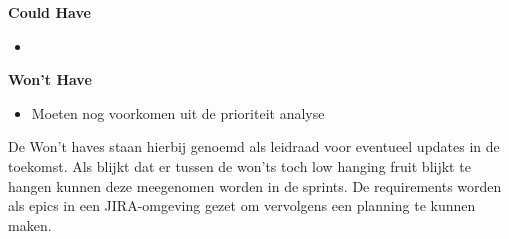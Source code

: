 \textbf{Could Have}
\begin{itemize}
    \item
\end{itemize}

\textbf{Won't Have}
\begin{itemize}
    \item Moeten nog voorkomen uit de prioriteit analyse
\end{itemize}
De Won't haves staan hierbij genoemd als leidraad voor eventueel updates in de toekomst.
Als blijkt dat er tussen de won'ts toch low hanging fruit blijkt te hangen kunnen deze meegenomen worden in de sprints.
De requirements worden als epics in een JIRA-omgeving gezet om vervolgens een planning te kunnen maken.
